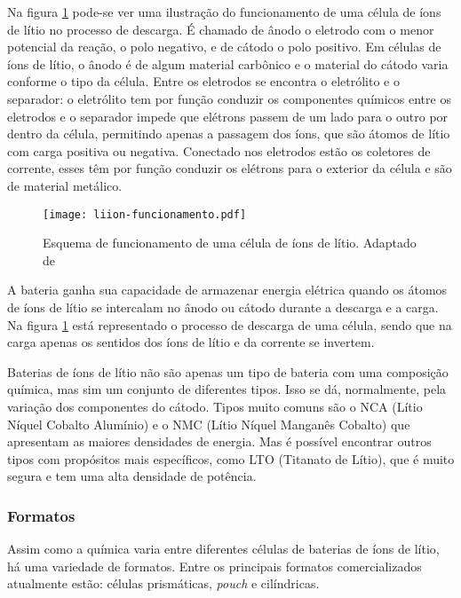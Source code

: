          Na figura \ref{fig:liion-funcionamento} pode-se ver uma ilustração do funcionamento de uma célula de íons de lítio no processo de descarga. É chamado de ânodo o eletrodo com o menor potencial da reação, o polo negativo, e de cátodo o polo positivo. Em células de íons de lítio, o ânodo é de algum material carbônico e o material do cátodo varia conforme o tipo da célula. Entre os eletrodos se encontra o eletrólito e o separador: o eletrólito tem por função conduzir os componentes químicos entre os eletrodos e o separador impede que elétrons passem de um lado para o outro por dentro da célula, permitindo apenas a passagem dos íons, que são átomos de lítio com carga positiva ou negativa. Conectado nos eletrodos estão os coletores de corrente, esses têm por função conduzir os elétrons para o exterior da célula e são de material metálico.

         \begin{figure}[!htb]
            \centering
            \texttt{[image: liion-funcionamento.pdf]}
            \caption{Esquema de funcionamento de uma célula de íons de lítio. Adaptado de \cite{Wal18}}
            \label{fig:liion-funcionamento}
         \end{figure}
   
         A bateria ganha sua capacidade de armazenar energia elétrica quando os átomos de íons de lítio se intercalam no ânodo ou cátodo durante a descarga e a carga. Na figura \ref{fig:liion-funcionamento} está representado o processo de descarga de uma célula, sendo que na carga apenas os sentidos dos íons de lítio e da corrente se invertem.

         Baterias de íons de lítio não são apenas um tipo de bateria com uma composição química, mas sim um conjunto de diferentes tipos. Isso se dá, normalmente, pela variação dos componentes do cátodo. Tipos muito comuns são o NCA (Lítio Níquel Cobalto Alumínio) e o NMC (Lítio Níquel Manganês Cobalto) que apresentam as maiores densidades de energia. Mas é possível encontrar outros tipos com propósitos mais específicos, como LTO (Titanato de Lítio), que é muito segura e tem uma alta densidade de potência.

      \subsubsection{Formatos}
         Assim como a química varia entre diferentes células de baterias de íons de lítio, há uma variedade de formatos. Entre os principais formatos comercializados atualmente estão: células prismáticas, \textit{pouch} e cilíndricas. 

